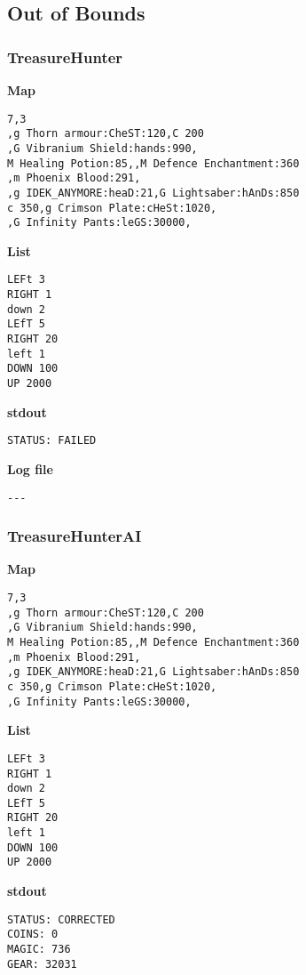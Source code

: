 \documentclass{article}
\begin{document}
\subsection{Out of Bounds}
\subsubsection{TreasureHunter}
\quad \textbf{Map}
\begin{lstlisting}
7,3
,g Thorn armour:CheST:120,C 200
,G Vibranium Shield:hands:990,
M Healing Potion:85,,M Defence Enchantment:360
,m Phoenix Blood:291,
,g IDEK_ANYMORE:heaD:21,G Lightsaber:hAnDs:850
c 350,g Crimson Plate:cHeSt:1020,
,G Infinity Pants:leGS:30000,
\end{lstlisting}

\textbf{List}
\begin{lstlisting}
LEFt 3
RIGHT 1
down 2
LEfT 5
RIGHT 20
left 1
DOWN 100
UP 2000
\end{lstlisting}
\pagebreak

\textbf{stdout}
\begin{lstlisting}
STATUS: FAILED
\end{lstlisting}

\textbf{Log file}
\begin{lstlisting}
---
\end{lstlisting}

\subsubsection{TreasureHunterAI}
\quad \textbf{Map}
\begin{lstlisting}
7,3
,g Thorn armour:CheST:120,C 200
,G Vibranium Shield:hands:990,
M Healing Potion:85,,M Defence Enchantment:360
,m Phoenix Blood:291,
,g IDEK_ANYMORE:heaD:21,G Lightsaber:hAnDs:850
c 350,g Crimson Plate:cHeSt:1020,
,G Infinity Pants:leGS:30000,
\end{lstlisting}

\textbf{List}
\begin{lstlisting}
LEFt 3
RIGHT 1
down 2
LEfT 5
RIGHT 20
left 1
DOWN 100
UP 2000
\end{lstlisting}
\pagebreak

\textbf{stdout}
\begin{lstlisting}
STATUS: CORRECTED
COINS: 0
MAGIC: 736
GEAR: 32031
\end{lstlisting}
\end{document}
